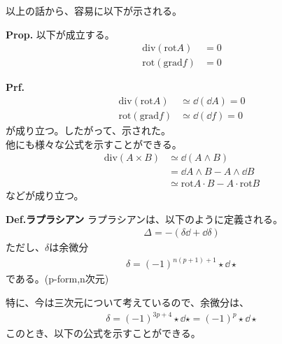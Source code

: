 \documentclass[a4paper,11pt]{jsarticle}
\numberwithin{equation}{section}
\begin{document}
以上の話から、容易に以下が示される。
\begin{itembox}[l]{\textbf{Prop.}}
  以下が成立する。
  \begin{align}
    \text{div}(\text{rot}A) &= 0\\
    \text{rot}(\text{grad}f) &= 0
  \end{align}
\end{itembox}
\textbf{Prf.}\\
\begin{align}
  \text{div}(\text{rot}A) &\simeq \dd(\dd{A}) =0\\
  \text{rot}(\text{grad}f) &\simeq \dd(\dd{f}) =0
\end{align}
が成り立つ。したがって、示された。\hfill\qedsymbol\\

他にも様々な公式を示すことができる。
\begin{align}
  \text{div}(A \times B) &\simeq \dd (A \wedge B)\\
  &= \dd A \wedge B - A \wedge \dd B\\
  &\simeq \text{rot}A \cdot B - A \cdot \text{rot}B
\end{align}
などが成り立つ。

\begin{itembox}[l]{\textbf{Def.ラプラシアン}}
  ラプラシアンは、以下のように定義される。
  \begin{align}
    \Delta = -(\delta \dd + \dd \delta)
  \end{align}
  ただし、$\delta$は余微分
  \begin{align}
    \delta = (-1)^{n(p+1)+1} \star \dd \star
  \end{align}
  である。(p-form,n次元)
\end{itembox}
特に、今は三次元について考えているので、余微分は、
\begin{align}
  \delta  = (-1)^{3p+4} \star \dd \star = (-1)^{p} \star \dd \star
\end{align}
このとき、以下の公式を示すことができる。
\end{document}
